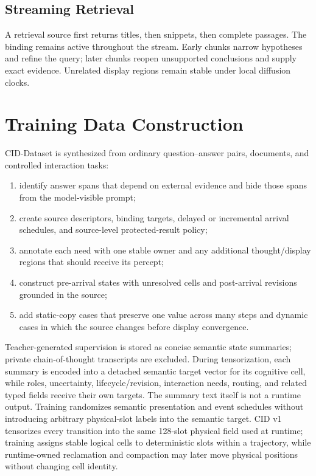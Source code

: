 \subsection{Streaming Retrieval}

A retrieval source first returns titles, then snippets, then complete passages. The binding remains active throughout the stream. Early chunks narrow hypotheses and refine the query; later chunks reopen unsupported conclusions and supply exact evidence. Unrelated display regions remain stable under local diffusion clocks.

\section{Training Data Construction}
\label{app:data}

CID-Dataset is synthesized from ordinary question--answer pairs, documents, and controlled interaction tasks:
\begin{enumerate}[leftmargin=*]
  \item identify answer spans that depend on external evidence and hide those spans from the model-visible prompt;
  \item create source descriptors, binding targets, delayed or incremental arrival schedules, and source-level protected-result policy;
  \item annotate each need with one stable owner and any additional thought/display regions that should receive its percept;
  \item construct pre-arrival states with unresolved cells and post-arrival revisions grounded in the source;
  \item add static-copy cases that preserve one value across many steps and dynamic cases in which the source changes before display convergence.
\end{enumerate}

Teacher-generated supervision is stored as concise semantic state summaries; private chain-of-thought transcripts are excluded. During tensorization, each summary is encoded into a detached semantic target vector for its cognitive cell, while roles, uncertainty, lifecycle/revision, interaction needs, routing, and related typed fields receive their own targets. The summary text itself is not a runtime output. Training randomizes semantic presentation and event schedules without introducing arbitrary physical-slot labels into the semantic target. CID v1 tensorizes every transition into the same 128-slot physical field used at runtime; training assigns stable logical cells to deterministic slots within a trajectory, while runtime-owned reclamation and compaction may later move physical positions without changing cell identity.

